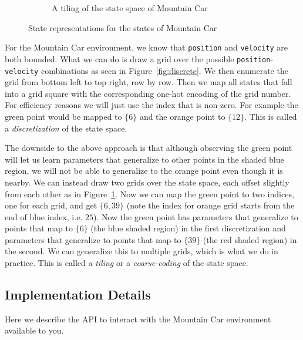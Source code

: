 \documentclass[11pt,addpoints,answers]{exam}
\begin{document}
\begin{figure}[H]
\begin{subfigure}{0.5\textwidth}
\caption{A tiling of the state space of Mountain Car}
\label{fig:tiling}
\end{subfigure}

\caption{State representations for the states of Mountain Car}
\label{fig:states}
\end{figure}

For the Mountain Car environment, we know that \texttt{position} and \texttt{velocity} are both bounded. What we can do is draw a grid over the possible \texttt{position}-\texttt{velocity} combinations as seen in Figure~\ref{fig:discrete}. We then enumerate the grid from bottom left to top right, row by row. Then we map all states that fall into a grid square with the corresponding one-hot encoding of the grid number. For efficiency reasons we will just use the index that is non-zero. For example the green point would be mapped to $\{6\}$ and the orange point to $\{12\}$. This is called a \emph{discretization} of the state space.

The downside to the above approach is that although observing the green point will let us learn parameters that generalize to other points in the shaded blue region, we will not be able to generalize to the orange point even though it is nearby. We can instead draw two grids over the state space, each offset slightly from each other as in Figure~\ref{fig:tiling}. Now we can map the green point to two indices, one for each grid, and get $\{6, 39\}$ (note the index for orange grid starts from the end of blue index, i.e. $25$). Now the green point has parameters that generalize to points that map to $\{6\}$ (the blue shaded region) in the first discretization and parameters that generalize to points that map to $\{39\}$ (the red shaded region) in the second. We can generalize this to multiple grids, which is what we do in practice. This is called a \emph{tiling} or a \emph{coarse-coding} of the state space. 


\subsection{Implementation Details}
Here we describe the API to interact with the Mountain Car environment available to you.
\end{document}
